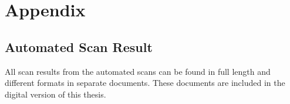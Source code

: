 \chapter{Appendix}
\label{app:an-appendix}


\section{Automated Scan Result}
\label{app:automated-scan-result}
All scan results from the automated scans can be found in full length and different formats in separate documents.
These documents are included in the digital version of this thesis.

